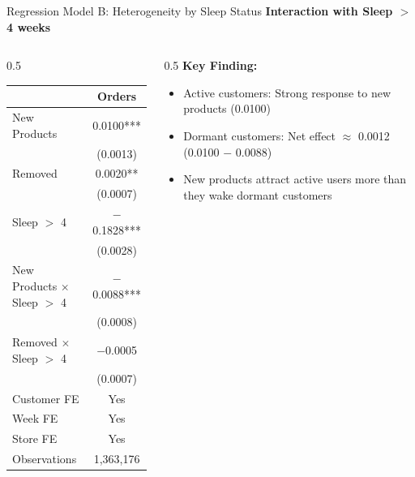 \documentclass[aspectratio=169]{beamer}  %
\begin{document}
\begin{frame}{Regression Model B: Heterogeneity by Sleep Status}
\textbf{Interaction with Sleep $>$ 4 weeks}
\begin{columns}
\begin{column}{0.5\linewidth}
    \begin{table}[h]
    \centering
    \scriptsize
    \begin{tabular}{lc}
    \toprule
     & \textbf{Orders} \\
    \midrule
    New Products & 0.0100*** \\
     & (0.0013) \\
    Removed & 0.0020** \\
     & (0.0007) \\
    Sleep $>$ 4 & $-$0.1828*** \\
     & (0.0028) \\
    New Products $\times$ Sleep $>$ 4 & $-$0.0088*** \\
     & (0.0008) \\
    Removed $\times$ Sleep $>$ 4 & $-$0.0005 \\
     & (0.0007) \\
    \midrule
    Customer FE & Yes \\
    Week FE & Yes \\
    Store FE & Yes \\
    \midrule
    Observations & 1,363,176 \\
    \bottomrule
    \end{tabular}
    \end{table}
\end{column}
\begin{column}{0.5\linewidth}
    \textbf{Key Finding:}
    \begin{itemize}
        \item Active customers: Strong response to new products (0.0100)
        \item Dormant customers: Net effect $\approx$ 0.0012 (0.0100 $-$ 0.0088)
        \item New products attract active users more than they wake dormant customers
    \end{itemize}
\end{column}
\end{columns}
\end{frame}
\end{document}
